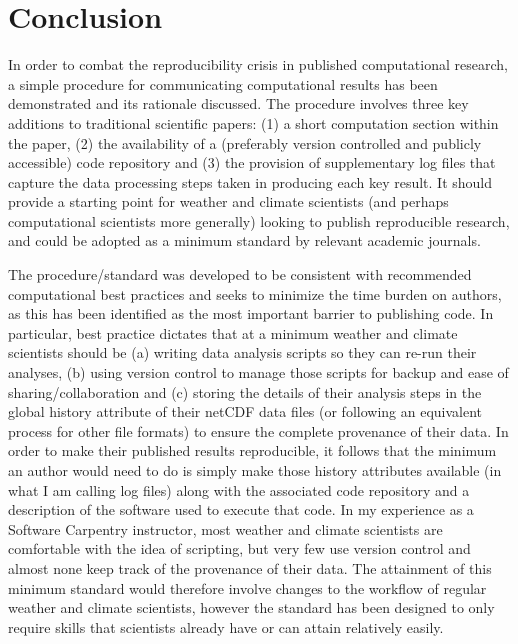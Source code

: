 \section{Conclusion}

In order to combat the reproducibility crisis in published computational research, a simple procedure for communicating computational results has been demonstrated \citep{Irving2015} and its rationale discussed. The procedure involves three key additions to traditional scientific papers: (1) a short computation section within the paper, (2) the availability of a (preferably version controlled and publicly accessible) code repository and (3) the provision of supplementary log files that capture the data processing steps taken in producing each key result. It should provide a starting point for weather and climate scientists (and perhaps computational scientists more generally) looking to publish reproducible research, and could be adopted as a minimum standard by relevant academic journals.

The procedure/standard was developed to be consistent with recommended computational best practices and seeks to minimize the time burden on authors, as this has been identified as the most important barrier to publishing code. In particular, best practice dictates that at a minimum weather and climate scientists should be (a) writing data analysis scripts so they can re-run their analyses, (b) using version control to manage those scripts for backup and ease of sharing/collaboration and (c) storing the details of their analysis steps in the global history attribute of their netCDF data files (or following an equivalent process for other file formats) to ensure the complete provenance of their data. In order to make their published results reproducible, it follows that the minimum an author would need to do is simply make those history attributes available (in what I am calling log files) along with the associated code repository and a description of the software used to execute that code. In my experience as a Software Carpentry instructor, most weather and climate scientists are comfortable with the idea of scripting, but very few use version control and almost none keep track of the provenance of their data. The attainment of this minimum standard would therefore involve changes to the workflow of regular weather and climate scientists, however the standard has been designed to only require skills that scientists already have or can attain relatively easily.  

